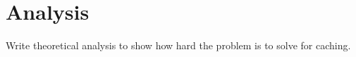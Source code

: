 \section{Analysis}\label{sec:analysis}

Write theoretical analysis to show how hard the problem is to solve for \spath caching.